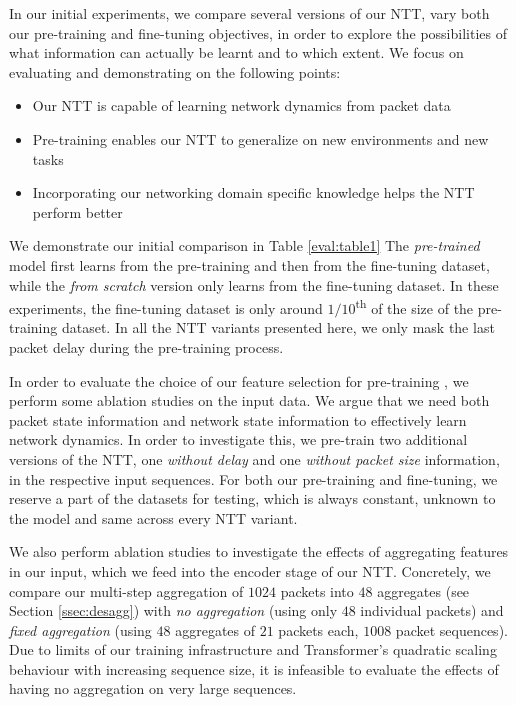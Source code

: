 In our initial experiments, we compare several versions of our NTT, vary both our pre-training and fine-tuning objectives, in order to explore the possibilities of what information can actually be learnt and to which extent. We focus on evaluating and demonstrating on the following points:

\begin{itemize}
\item Our NTT is capable of learning network dynamics from packet data 
\item Pre-training enables our NTT to generalize on new environments and new tasks 
\item Incorporating our networking domain specific knowledge helps the NTT perform better
\end{itemize}

We demonstrate our initial comparison in Table \ref{eval:table1} The \emph{pre-trained} model first learns from the pre-training and then from the fine-tuning dataset, while the \emph{from scratch} version only learns from the fine-tuning dataset. In these experiments, the fine-tuning dataset is only around $1/10$\textsuperscript{th} of the size of the pre-training dataset. In all the NTT variants presented here, we only mask the last packet delay during the pre-training process.

In order to evaluate the choice of our feature selection for pre-training , we perform some ablation studies on the input data. We argue that we need both packet state information and network state information to effectively learn network dynamics. In order to investigate this, we pre-train two additional versions of the NTT, one \emph{without delay} and one \emph{without packet size} information, in the respective input sequences. For both our pre-training and fine-tuning, we reserve a part of the datasets for testing, which is always constant, unknown to the model and same across every NTT variant.

We also perform ablation studies to investigate the effects of aggregating features in our input, which we feed into the encoder stage of our NTT. Concretely, we compare our multi-step aggregation of $1024$ packets into $48$ aggregates (see Section \ref{ssec:desagg}) with \emph{no aggregation} (using only $48$ individual packets) and \emph{fixed aggregation} (using $48 $ aggregates of $21$ packets each, \ie $1008$ packet sequences). Due to limits of our training infrastructure and Transformer's quadratic scaling behaviour with increasing sequence size, it is infeasible to evaluate the effects of having no aggregation on very large sequences.



